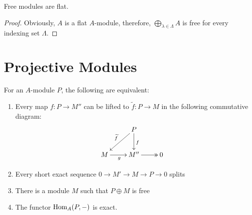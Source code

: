 \begin{corollary}
    Free modules are flat.
\end{corollary}
\begin{proof}
    Obviously, $A$ is a flat $A$-module, therefore, $\bigoplus_{\lambda\in\Lambda}A$ is free for every indexing set $\Lambda$.
\end{proof}

\section{Projective Modules}

\begin{theorem}
    For an $A$-module $P$, the following are equivalent: 
    \begin{enumerate}[label=(\alph*)]
    \item Every map $f: P\to M''$ can be lifted to $\widetilde{f}: P\to M$ in the following commutative diagram: 
    \begin{equation*}
    \xymatrix{
        & P\ar[ld]_{\widetilde f}\ar[d]^f & \\
        M\ar[r]_g & M''\ar@{->>}[r] & 0
    }
    \end{equation*}
    \item Every short exact sequence $0\rightarrow M'\rightarrow M\rightarrow P\rightarrow 0$ splits 
    \item There is a module $M$ such that $P\oplus M$ is free 
    \item The functor $\operatorname{Hom}_A(P,-)$ is exact.
    \end{enumerate}
\end{theorem}
